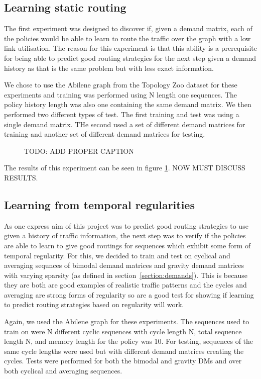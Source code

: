 \subsection{Learning static routing}
The first experiment was designed to discover if, given a demand matrix, each of the policies would be able to learn to route the traffic over the graph with a low link utilisation. The reason for this experiment is that this ability is a prerequisite for being able to predict good routing strategies for the next step given a demand history as that is the same problem but with less exact information.

We chose to use the Abilene graph from the Topology Zoo dataset for these experiments and training was performed using N length one sequences. The policy history length was also one containing the same demand matrix. We then performed two different types of test. The first training and test was using a single demand matrix. THe second used a set of different demand matrices for training and another set of different demand matrices for testing.

\begin{figure}
    \centering
%    
    \caption{TODO: ADD PROPER CAPTION}
    \label{fig:exp_static}
\end{figure}

The results of this experiment can be seen in figure \ref{fig:exp_static}. NOW MUST DISCUSS RESULTS.


\subsection{Learning from temporal regularities}
As one express aim of this project was to predict good routing strategies to use given a history of traffic information, the next step was to verify if the policies are able to learn to give good routings for sequences which exhibit some form of temporal regularity. For this, we decided to train and test on cyclical and averaging sequnces of bimodal demand matrices and gravity demand matrices with varying sparsity (as defined in section~\ref{section:demands}). This is because they are both are good examples of realistic traffic patterns and the cycles and averaging are strong forms of regularity so are a good test for showing if learning to predict routing strategies based on regularity will work.

Again, we used the Abilene graph for these experiments. The sequences used to train on were N different cyclic sequences with cycle length N, total sequence length N, and memory length for the policy was 10. For testing, sequences of the same cycle lengths were used but with different demand matrices creating the cycles. Tests were performed for both the bimodal and gravity DMs and over both cyclical and averaging sequences.

